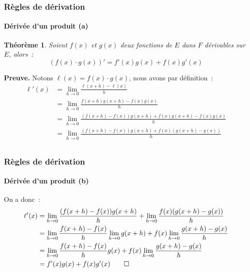 \documentclass[10pt,notheorems]{beamer}
\theoremstyle{plain}
\newtheorem{theorem}{Théorème}
\theoremstyle{definition} %
\begin{document}
\begin{frame}
  \frametitle{Règles de dérivation}
  \framesubtitle{Dérivée d'un produit (a)}
  \hypertarget{slide_derivee_produit_1}{}

  \begin{theorem}
    Soient $f(x)$ et $g(x)$ deux fonctions de $E$ dans $F$ dérivables sur $E$, alors~:
    \[
      (f(x)\cdot g(x))' = f'(x)g(x) + f(x)g'(x)
    \]
  \end{theorem}

  \bigskip

  {\small \textbf{Preuve.} Notons $\ell(x) = f(x) \cdot g(x)$, nous avons par définition~:
    \[
      \begin{split}
        \ell'(x) &= \lim_{h\rightarrow 0} \frac{\ell(x+h)-\ell(x)}{h}\\
        &= \lim_{h\rightarrow 0} \frac{f(x+h)g(x+h)-f(x)g(x)}{h} \\
        &= \lim_{h\rightarrow 0} \frac{(f(x+h)-f(x))g(x+h)+f(x)g(x+h)-f(x)g(x)}{h}\\
        &= \lim_{h\rightarrow 0} \frac{(f(x+h)-f(x))g(x+h)+f(x)(g(x+h)-g(x))}{h}\\
      \end{split}
    \]
  }

\end{frame}


\begin{frame}
  \frametitle{Règles de dérivation}
  \framesubtitle{Dérivée d'un produit (b)}
  \hypertarget{slide_derivee_produit_2}{}

  {\small On a donc~:
    \[
      \begin{split}
        \ell'(x) &= \lim_{h\rightarrow 0} \frac{(f(x+h)-f(x))g(x+h)}{h} + \lim_{h\rightarrow 0} \frac{f(x)(g(x+h)-g(x))}{h}\\
        &= \lim_{h\rightarrow 0} \frac{f(x+h)-f(x)}{h}\lim_{h\rightarrow 0} g(x+h) + f(x)\lim_{h\rightarrow 0} \frac{g(x+h)-g(x)}{h}\\
        &= \lim_{h\rightarrow 0} \frac{f(x+h)-f(x)}{h}g(x) + f(x)\lim_{h\rightarrow 0} \frac{g(x+h)-g(x)}{h}\\
        &= f'(x)g(x) + f(x)g'(x) \qed
      \end{split}
    \]
  }

\end{frame}
\end{document}
